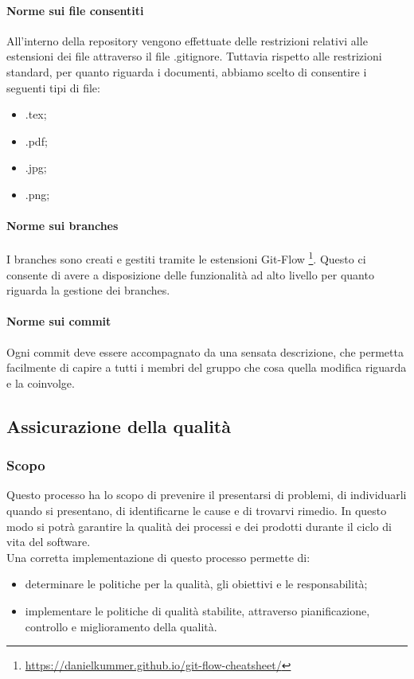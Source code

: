 \documentclass[11pt,a4paper]{article}
\begin{document}
{\paragraph{Norme sui file consentiti}
All'interno della repository vengono effettuate delle restrizioni relativi alle estensioni dei file attraverso il file .gitignore.
Tuttavia rispetto alle restrizioni standard, per quanto riguarda i documenti, abbiamo scelto di consentire i seguenti tipi di file: 
\begin{itemize}
	\item .tex;
	\item .pdf;
	\item .jpg;
	\item .png;
\end{itemize}

\paragraph{Norme sui branches}
I branches sono creati e gestiti tramite le estensioni Git-Flow
\footnote{\url{https://danielkummer.github.io/git-flow-cheatsheet/}}. 
Questo ci consente di avere a disposizione delle funzionalità ad alto livello per quanto riguarda la gestione dei branches. 

\paragraph{Norme sui commit}
Ogni commit deve essere accompagnato da una sensata descrizione, che permetta facilmente di capire a tutti i membri del gruppo che cosa quella modifica riguarda e la coinvolge.

	\subsection{Assicurazione della qualità}
	\subsubsection{Scopo}
	Questo processo ha lo scopo di prevenire il presentarsi di problemi, di individuarli quando si presentano, di identificarne le cause e di trovarvi rimedio. In questo modo si potrà garantire la qualità dei processi e dei prodotti durante il ciclo di vita del software.
	\\
	Una corretta implementazione di questo processo permette di:
	\begin{itemize}
		\item determinare le politiche per la qualità, gli obiettivi e le responsabilità;
		\item implementare le politiche di qualità stabilite, attraverso pianificazione, controllo e miglioramento della qualità. 
	\end{itemize}
	
}
\end{document}
